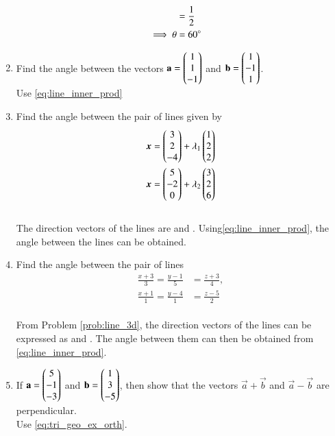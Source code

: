 \begin{enumerate}[label=\arabic*.,ref=\thesubsection.\theenumi]
\begin{align}
\\
&=\frac{1}{2}
\\
\implies \theta &= 60\degree
\end{align}
%
\item Find the angle between the vectors 
$\mathbf{a}=\begin{pmatrix}1\\1\\-1\end{pmatrix}$
  and 
$\mathbf{b}=\begin{pmatrix}1\\-1\\1\end{pmatrix}$.
%
\\
\solution Use \eqref{eq:line_inner_prod}
%
\item Find the angle between the pair of lines given by 
\begin{align}
\bm{x} &= \begin{pmatrix}3\\2\\-4\end{pmatrix} + \lambda_1\begin{pmatrix}1 \\ 2 \\2\end{pmatrix}
\\
\bm{x} &= \begin{pmatrix}5\\-2\\0\end{pmatrix} + \lambda_2\begin{pmatrix}3 \\ 2 \\6\end{pmatrix}
\end{align}
%
\\
\solution The direction vectors of the lines are  and .   Using\eqref{eq:line_inner_prod}, the angle between the lines can be obtained. 
\item Find the angle between the pair of lines
\begin{align}
\frac{x+3}{3} = \frac{y-1}{5} &= \frac{z+3}{4}, 
\\
\frac{x+1}{1} = \frac{y-4}{1} &= \frac{z-5}{2} 
\end{align}
%
\\
\solution From Problem \ref{prob:line_3d}, the direction vectors of the lines can be expressed as  and .  The angle between them can then be obtained from \eqref{eq:line_inner_prod}.
%
\item If 
$\mathbf{a}=\begin{pmatrix}5\\-1\\-3\end{pmatrix}$
  and 
$\mathbf{b}=\begin{pmatrix}1\\3\\-5\end{pmatrix}$,
%
then show that the vectors $\vec{a}+\vec{b}$ and $\vec{a}-\vec{b}$ are perpendicular.
%
\\
\solution Use \eqref{eq:tri_geo_ex_orth}.
%


\end{enumerate}
